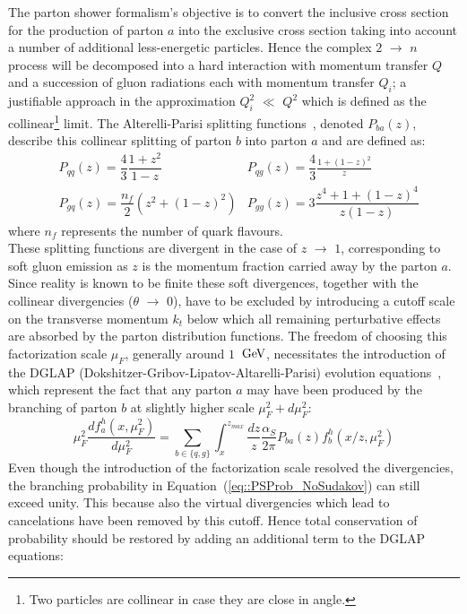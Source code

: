 The parton shower formalism's objective is to convert the inclusive cross section for the production of parton $a$ into the exclusive cross section taking into account a number of additional less-energetic particles.
Hence the complex $2$ $\rightarrow$ $n$ process will be decomposed into a hard interaction with momentum transfer $Q$ and a succession of gluon radiations each with momentum transfer $Q_{i}$; a justifiable approach in the approximation $Q_{i}^{2}$ $\ll$ $Q^2$ which is defined as the collinear\footnote{Two particles are collinear in case they are close in angle.} limit. 
The Alterelli-Parisi splitting functions~\cite{}, denoted $P_{ba}(z)$, describe this collinear splitting of parton $b$ into parton $a$ and are defined as:
\begin{eqnarray}
 & P_{qq}(z) = \dfrac{4}{3} \dfrac{1+z^{2}}{1-z}    & P_{qg}(z) = \dfrac{4}{3} \frac{1+(1-z)^{2}}{z} \\
 & P_{gq}(z) = \dfrac{n_{f}}{2} (z^{2} + (1-z)^{2}) & P_{gg}(z) = 3 \dfrac{z^{4}+1+(1-z)^{4}}{z(1-z)}
\end{eqnarray}
where $n_{f}$ represents the number of quark flavours.
\\
These splitting functions are divergent in the case of $z$ $\rightarrow$ $1$, corresponding to soft gluon emission as $z$ is the momentum fraction carried away by the parton $a$. 
Since reality is known to be finite these soft divergences, together with the collinear divergencies ($\theta$ $\rightarrow$ $0$), have to be excluded by introducing a cutoff scale on the transverse momentum $k_{t}$ below which all remaining perturbative effects are absorbed by the parton distribution functions. 
The freedom of choosing this factorization scale $\mu_{F}$, generally around $1$ $\, \mathrm{GeV}$, necessitates the introduction of the DGLAP (Dokshitzer-Gribov-Lipatov-Altarelli-Parisi) evolution equations~\cite{}, which represent the fact that any parton $a$ may have been produced by the branching of parton $b$ at slightly higher scale $\mu_{F}^2 + d\mu_{F}^2$:\\
\begin{equation}\label{eq::PSProb_NoSudakov}
 \mu_{F}^2 \dfrac{d f_{a}^{h}(x,\mu_{F}^{2})}{d \mu_{F}^{2}} = \sum_{b \in \{q,g\} } \int_{x}^{z_{max}} \dfrac{dz}{z} \dfrac{\alpha_{S}}{2 \pi} P_{ba}(z) f_{b}^{h}(x/z, \mu_{F}^{2})
\end{equation}
Even though the introduction of the factorization scale resolved the divergencies, the branching probability in Equation~(\ref{eq::PSProb_NoSudakov}) can still exceed unity. This because also the virtual divergencies which lead to cancelations have been removed by this cutoff. Hence total conservation of probability should be restored by adding an additional term to the DGLAP equations:
